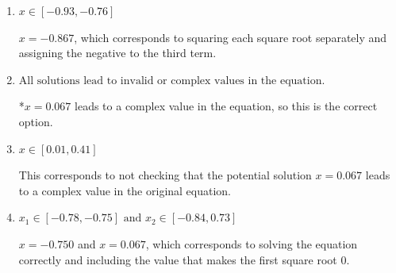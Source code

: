\documentclass{extbook}[14pt]
\begin{document}
\begin{enumerate}
{\begin{enumerate}[label=\Alph*.]
$x = -0.750$ and $x = 1.000$, which corresponds to solving each radical separately for 0.
\item \( x \in [-0.93,-0.76] \)

$x = -0.867$, which corresponds to squaring each square root separately and assigning the negative to the third term.
\item \( \text{All solutions lead to invalid or complex values in the equation.} \)

*$x = 0.067$ leads to a complex value in the equation, so this is the correct option.
\item \( x \in [0.01,0.41] \)

This corresponds to not checking that the potential solution $x = 0.067$ leads to a complex value in the original equation.
\item \( x_1 \in [-0.78, -0.75] \text{ and } x_2 \in [-0.84,0.73] \)

$x = -0.750$ and $x = 0.067$, which corresponds to solving the equation correctly and including the value that makes the first square root 0.
\end{enumerate}

}
\end{enumerate}
\end{document}
